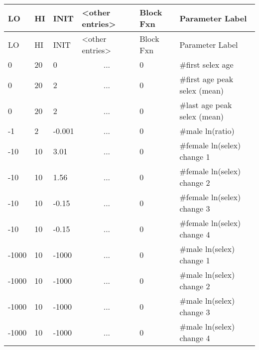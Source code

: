 	\begin{longtable}{p{1cm} p{1cm} p{1cm} p{2.9cm} p{1.8cm} p{5.1cm}}
		\hline
		LO \Tstrut & HI & INIT & <other entries> & Block Fxn & Parameter Label \Bstrut\\
		\hline
		\endfirsthead
	
		\hline
		LO \Tstrut & HI & INIT & <other entries> & Block Fxn & Parameter Label \Bstrut\\
		\hline
		\endhead

		0     & 20 &  0     & \multicolumn{1}{c}{...} & 0 & \#first selex age \Tstrut\\
		0     & 20 &  2     & \multicolumn{1}{c}{...} & 0 & \#first age peak selex (mean) \\
		0     & 20 &  2     & \multicolumn{1}{c}{...} & 0 & \#last age peak selex (mean) \\
		-1    & 2  & -0.001 & \multicolumn{1}{c}{...} & 0 & \#male ln(ratio) \\
		-10   & 10 &  3.01  & \multicolumn{1}{c}{...} & 0 & \#female ln(selex) change 1 \\
		-10   & 10 &  1.56  & \multicolumn{1}{c}{...} & 0 & \#female ln(selex) change 2 \\
		-10   & 10 & -0.15  & \multicolumn{1}{c}{...} & 0 & \#female ln(selex) change 3 \\
		-10   & 10 & -0.15  & \multicolumn{1}{c}{...} & 0 & \#female ln(selex) change 4 \\
		-1000 & 10 & -1000  & \multicolumn{1}{c}{...} & 0 & \#male ln(selex) change 1 \\
		-1000 & 10 & -1000  & \multicolumn{1}{c}{...} & 0 & \#male ln(selex) change 2 \\
		-1000 & 10 & -1000  & \multicolumn{1}{c}{...} & 0 & \#male ln(selex) change 3 \\
		-1000 & 10 & -1000  & \multicolumn{1}{c}{...} & 0 & \#male ln(selex) change 4 \Bstrut\\
		\hline
	\end{longtable}

